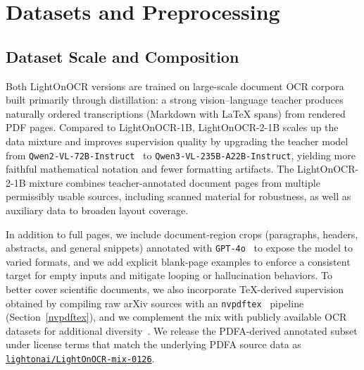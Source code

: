 \documentclass{article}
\begin{document}


\section{Datasets and Preprocessing}
\label{sec:data}

\subsection{Dataset Scale and Composition}\label{annotations}
Both LightOnOCR versions are trained on large-scale document OCR corpora built primarily through distillation: a strong vision--language teacher produces naturally ordered transcriptions (Markdown with \LaTeX{} spans) from rendered PDF pages. Compared to LightOnOCR-1B, LightOnOCR-2-1B scales up the data mixture and improves supervision quality by upgrading the teacher model from \texttt{Qwen2-VL-72B-Instruct}~\cite{Qwen2VL} to \texttt{Qwen3-VL-235B-A22B-Instruct}, yielding more faithful mathematical notation and fewer formatting artifacts. The LightOnOCR-2-1B mixture combines teacher-annotated document pages from multiple permissibly usable sources, including scanned material for robustness, as well as auxiliary data to broaden layout coverage.

In addition to full pages, we include document-region crops (paragraphs, headers, abstracts, and general snippets) annotated with \texttt{GPT-4o}~\cite{openai2024gpt4o} to expose the model to varied formats, and we add explicit blank-page examples to enforce a consistent target for empty inputs and mitigate looping or hallucination behaviors. To better cover scientific documents, we also incorporate \TeX{}-derived supervision obtained by compiling raw arXiv sources with an \texttt{nvpdftex}~\cite{nvtexlive2025} pipeline (Section~\ref{nvpdftex}), and we complement the mix with publicly available OCR datasets for additional diversity~\cite{poznanski2025olmocr2}. We release the PDFA-derived annotated subset under license terms that match the underlying PDFA source data as \texttt{\href{https://huggingface.co/datasets/lightonai/LightOnOCR-mix-0126}{lightonai/LightOnOCR-mix-0126}}.
\end{document}
